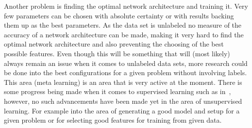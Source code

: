 Another problem is finding the optimal network architecture and training it. Very few parameters can be chosen with absolute certainty or with results backing them up as the best parameters. As the data set is unlabeled no measure of the accuracy of a network architecture can be made, making it very hard to find the optimal network architecture and also preventing the choosing of the best possible features. Even though this will be something that will (most likely) always remain an issue when it comes to unlabeled data sets, more research could be done into the best configurations for a given problem without involving labels. This area (meta learning) is an area that is very active at the moment. There is some progress being made when it comes to supervised learning such as in~\cite{zoph2016neural}, however, no such advancements have been made yet in the area of unsupervised learning. For example into the area of generating a good model and setup for a given problem or for selecting good features for training from given data.